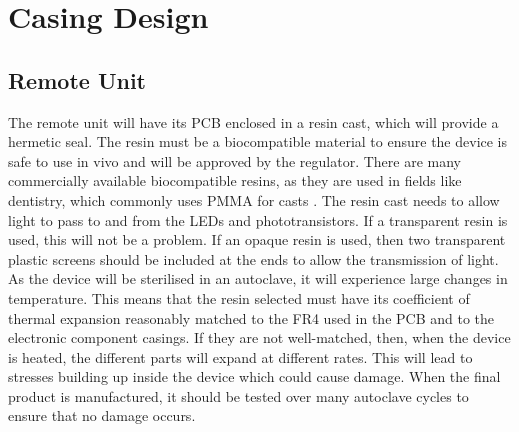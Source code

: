 \section{Casing Design}

\subsection{Remote Unit}
The remote unit will have its PCB enclosed in a resin cast, which will provide a hermetic seal. The resin must be a biocompatible material to ensure the device is safe to use in vivo and will be approved by the regulator. There are many commercially available biocompatible resins, as they are used in fields like dentistry, which commonly uses PMMA for casts \cite{biocompatible_resin}. The resin cast needs to allow light to pass to and from the LEDs and phototransistors. If a transparent resin is used, this will not be a problem. If an opaque resin is used, then two transparent plastic screens should be included at the ends to allow the transmission of light.\\

As the device will be sterilised in an autoclave, it will experience large changes in temperature. This means that the resin selected must have its coefficient of thermal expansion reasonably matched to the FR4 used in the PCB and to the electronic component casings. If they are not well-matched, then, when the device is heated, the different parts will expand at different rates. This will lead to stresses building up inside the device which could cause damage. When the final product is manufactured, it should be tested over many autoclave cycles to ensure that no damage occurs.\\

